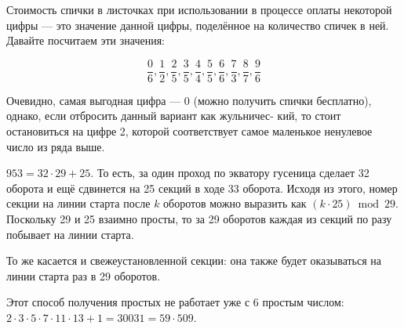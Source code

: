 \begin{itemize}
\itA Стоимость спички в листочках при использовании в процессе
оплаты некоторой цифры --- это значение данной цифры, 
поделённое на количество спичек в ней. Давайте посчитаем эти значения:

$$\frac{0}{6}, \frac{1}{2}, \frac{2}{5}, \frac{3}{5}, \frac{4}{4}, \frac{5}{5}, \frac{6}{6}, \frac{7}{3}, \frac{8}{7}, \frac{9}{6}$$

Очевидно, самая выгодная цифра --- 0 (можно получить спички бесплатно), однако, если
отбросить данный вариант как жульничес-\linebreak
кий, то стоит остановиться на цифре 2, которой соответствует
самое маленькое ненулевое число из ряда выше.

\itB $953 = 32 \cdot 29 + 25$. То есть, за один проход по экватору 
гусеница сделает 32 оборота и ещё сдвинется на 25
секций в ходе 33 оборота. Исходя из этого, номер секции на линии старта после $k$ оборотов можно
выразить как $(k \cdot 25) \bmod 29$. Поскольку 29 и 25 взаимно просты, то за 29 оборотов каждая из 
секций по разу побывает
на линии старта.

То же касается и свежеустановленной секции: она также будет оказываться 
на линии старта раз в 29 оборотов. 

\itC Этот способ получения простых не работает уже с 6 
простым числом: $2\cdot 3 \cdot 5 \cdot 7 \cdot 11 \cdot 13 + 1 = 30031 = 59 \cdot 509$.

\end{itemize}

